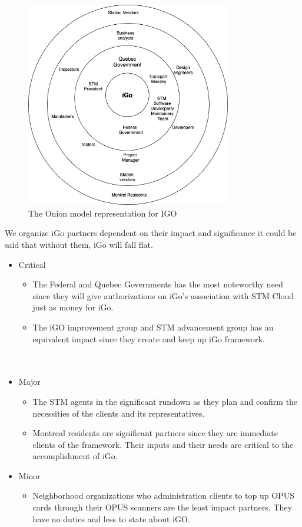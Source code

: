 \documentclass[11pt, english]{report}
\begin{document}
\begin{figure}[H]
  
  \includegraphics[width=0.8\textwidth]{images/context.png}
  \centering
  \caption{ The Onion model representation for IGO }

\end{figure}
We organize iGo partners dependent on their impact and significance it could be said that without them, iGo will fall flat.
\\
 \begin{itemize}
   \item  Critical
   \begin{itemize}
     \item  The Federal and Quebec Governments has the most noteworthy need since they will give authorizations on iGo's association with STM Cloud just as money for iGo.
    \item The iGO improvement group and STM advancement group has an equivalent impact since they create and keep up iGo framework.\\ \\ \\
   \end{itemize}
   \item  Major
   \begin{itemize}
     \item  The STM agents in the significant rundown as they plan and confirm the necessities of the clients and its representatives.
\item Montreal residents are significant partners since they are immediate clients of the framework. Their inputs and their needs are critical to the accomplishment of iGo.

   \end{itemize}
    \item  Minor
   \begin{itemize}
     \item Neighborhood organizations who administration clients to top up OPUS cards through their OPUS scanners are the least impact partners. They have no duties and less to state about iGO.

   \end{itemize}
 \end{itemize}
 
\end{document}
